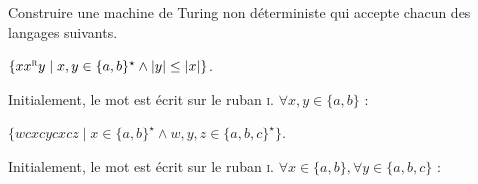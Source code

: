 
\begingroup

\begin{exercice}

  Construire une machine de Turing non déterministe qui accepte chacun des langages suivants.
  
  \begin{questions}
  \item $\{x x^\textsc{r} y \mid x, y \in \{a, b\}^\star \land |y| \le |x| \}$.
  \end{questions}
  \begin{corrections}
    Initialement, le mot est écrit sur le ruban \textsc{i}. $\forall x, y \in \{a, b\}$ :
    
  \end{corrections}

  \begin{questions}
  \item $\{w c x c y c x c z \mid x \in \{a, b\}^\star \land  w, y, z \in \{a, b, c\}^\star\}$.
  \end{questions}
  \begin{corrections}
    Initialement, le mot est écrit sur le ruban \textsc{i}. $\forall x \in \{a, b\}, \forall y \in \{a, b, c\}$ :
    

\end{corrections}
\end{exercice}
